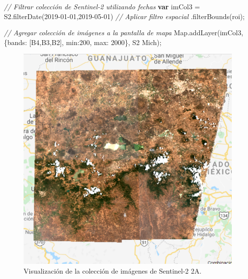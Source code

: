 \documentclass[
  12pt,
  letterpaper,
  twoside]{book}
\newenvironment{Shaded}{\begin{snugshade}}{\end{snugshade}}
\newcommand{\CommentTok}[1]{\textcolor[rgb]{0.24,0.58,0.00}{\textit{#1}}}
\newcommand{\ControlFlowTok}[1]{\textcolor[rgb]{0.00,0.00,0.00}{\textbf{#1}}}
\newcommand{\DataTypeTok}[1]{\textcolor[rgb]{0.00,0.00,0.00}{#1}}
\newcommand{\DecValTok}[1]{\textcolor[rgb]{0.28,0.53,0.93}{#1}}
\newcommand{\FunctionTok}[1]{\textcolor[rgb]{0.48,0.12,0.64}{#1}}
\newcommand{\KeywordTok}[1]{\textcolor[rgb]{0.48,0.12,0.64}{#1}}
\newcommand{\NormalTok}[1]{#1}
\newcommand{\OperatorTok}[1]{\textcolor[rgb]{0.00,0.00,0.00}{#1}}
\newcommand{\StringTok}[1]{\textcolor[rgb]{0.87,0.29,0.22}{#1}}
\begin{document}
\begin{Shaded}
\begin{Highlighting}[]
\CommentTok{// Filtrar colección de Sentinel{-}2 utilizando fechas}
\ControlFlowTok{var}\NormalTok{ imCol3 }\OperatorTok{=}\NormalTok{ S2}\OperatorTok{.}\FunctionTok{filterDate}\NormalTok{(}\StringTok{\textquotesingle{}2019{-}01{-}01\textquotesingle{}}\OperatorTok{,}\StringTok{\textquotesingle{}2019{-}05{-}01\textquotesingle{}}\NormalTok{)}
  \CommentTok{// Aplicar filtro espacial}
 \OperatorTok{.}\FunctionTok{filterBounds}\NormalTok{(roi)}\OperatorTok{;}

\CommentTok{// Agregar colección de imágenes a la pantalla de mapa}
\KeywordTok{Map}\OperatorTok{.}\FunctionTok{addLayer}\NormalTok{(imCol3}\OperatorTok{,}\NormalTok{ \{}\DataTypeTok{bands}\OperatorTok{:}\NormalTok{ [}\StringTok{\textquotesingle{}B4\textquotesingle{}}\OperatorTok{,}\StringTok{\textquotesingle{}B3\textquotesingle{}}\OperatorTok{,}\StringTok{\textquotesingle{}B2\textquotesingle{}}\NormalTok{]}\OperatorTok{,} \DataTypeTok{min}\OperatorTok{:}\DecValTok{200}\OperatorTok{,} \DataTypeTok{max}\OperatorTok{:} \DecValTok{2000}\NormalTok{\}}\OperatorTok{,} 
  \StringTok{\textquotesingle{}S2 Mich\textquotesingle{}}\NormalTok{)}\OperatorTok{;}
\end{Highlighting}
\end{Shaded}

\begin{figure}[H]

{\centering \includegraphics[width=0.8\linewidth]{Img/visS2Mich} 

}

\caption{Visualización de la colección de imágenes de Sentinel-2 2A.}\label{fig:f103}
\end{figure}
\end{document}
